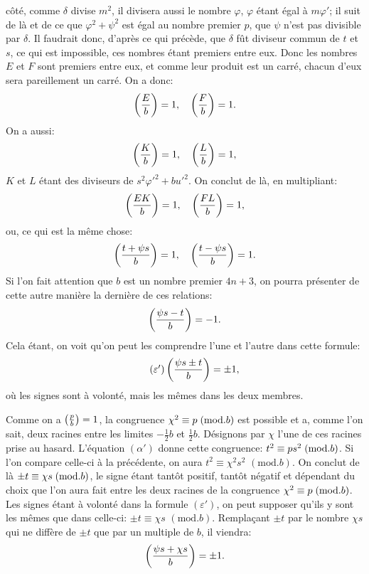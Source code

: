 \noindent
côté, comme $\delta$ divise $m^2$, il divisera aussi le nombre $\varphi$, $\varphi$ étant égal à $m\varphi'$;
il suit de là et de ce que $\varphi^2+\psi^2$ est égal au nombre premier $p$, que $\psi$ n'est
pas divisible par $\delta$. Il faudrait donc, d'après ce qui précède, que $\delta$ fût diviseur
commun de $t$ et $s$, ce qui est impossible, ces nombres étant premiers entre
eux. Donc les nombres $E$ et $F$ sont premiers entre eux, et comme leur produit
est un carré, chacun d'eux sera pareillement un carré. On a donc:
\[
\left(\frac{E}{b}\right)=1,\quad\left(\frac{F}{b}\right)=1.
\]
On a aussi:
\[
\left(\frac{K}{b}\right)=1,\quad\left(\frac{L}{b}\right)=1,
\]
$K$ et $L$ étant des diviseurs de $s^2\varphi'^2+bu'^2$. On conclut de là, en multipliant:
\[
\left(\frac{EK}{b}\right)=1,\quad\left(\frac{FL}{b}\right)=1,
\]
ou, ce qui est la même chose:
\[
\left(\frac{t+\psi s}{b}\right)=1,\quad\left(\frac{t-\psi s}{b}\right)=1.
\]
Si l'on fait attention que $b$ est un nombre premier $4n+3$, on pourra présenter
de cette autre manière la dernière de ces relations:
\[
\left(\frac{\psi s-t}{b}\right)=-1.
\]
Cela étant, on voit qu'on peut les comprendre l'une et l'autre dans cette formule:
\begin{equation*}\tag{$\varepsilon'$}
\left(\frac{\psi s\pm t}{b}\right)=\pm1,
\end{equation*}
où les signes sont à volonté, mais les mêmes dans les deux membres.
\par\indent
Comme on a $\left(\frac{p}{b}\right)=1$, la congruence $\chi^2\equiv p\;(\mathrm{mod}.b)$ est possible et
a, comme l'on sait, deux racines entre les limites $-\frac12b$ et $\frac12b$. Désignons par
$\chi$ l'une de ces racines prise au hasard. L'équation $(\alpha')$ donne cette congruence:
$t^2\equiv ps^2\;(\mathrm{mod}.b)$. Si l'on compare celle-ci à la précédente, on aura $t^2\equiv\chi^2s^2$
$(\mathrm{mod}.b)$. On conclut de là $\pm t\equiv\chi s\;(\mathrm{mod}.b)$, le signe étant tantôt positif,
tantôt négatif et dépendant du choix que l'on aura fait entre les deux racines
de la congruence $\chi^2\equiv p\;(\mathrm{mod}.b)$. Les signes étant à volonté dans la formule
$(\varepsilon')$, on peut supposer qu'ils y sont les mêmes que dans celle-ci: $\pm t\equiv\chi s$
$(\mathrm{mod}.b)$. Remplaçant $\pm t$ par le nombre $\chi s$ qui ne diffère de $\pm t$ que par un
multiple de $b$, il viendra:
\[
\left(\frac{\psi s+\chi s}{b}\right)=\pm1.
\]
